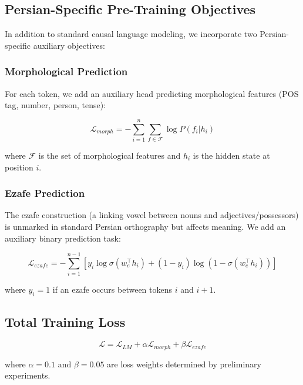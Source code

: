 \documentclass[11pt,a4paper]{article}
\begin{document}
\subsection{Persian-Specific Pre-Training Objectives}

In addition to standard causal language modeling, we incorporate two Persian-specific auxiliary objectives:

\subsubsection{Morphological Prediction}

For each token, we add an auxiliary head predicting morphological features (POS tag, number, person, tense):

\begin{equation}
    \mathcal{L}_{\mathit{morph}} = -\sum_{i=1}^{n} \sum_{f \in \mathcal{F}} \log P(f_i | h_i)
\end{equation}

where $\mathcal{F}$ is the set of morphological features and $h_i$ is the hidden state at position $i$.

\subsubsection{Ezafe Prediction}

The ezafe construction (a linking vowel between nouns and adjectives/possessors) is unmarked in standard Persian orthography but affects meaning. We add an auxiliary binary prediction task:

\begin{equation}
    \mathcal{L}_{\mathit{ezafe}} = -\sum_{i=1}^{n-1} \left[ y_i \log \sigma(w_e^\top h_i) + (1 - y_i) \log (1 - \sigma(w_e^\top h_i)) \right]
\end{equation}

where $y_i = 1$ if an ezafe occurs between tokens $i$ and $i+1$.

\subsection{Total Training Loss}

\begin{equation}
    \mathcal{L} = \mathcal{L}_{\mathit{LM}} + \alpha \mathcal{L}_{\mathit{morph}} + \beta \mathcal{L}_{\mathit{ezafe}}
\end{equation}

where $\alpha = 0.1$ and $\beta = 0.05$ are loss weights determined by preliminary experiments.
\end{document}
